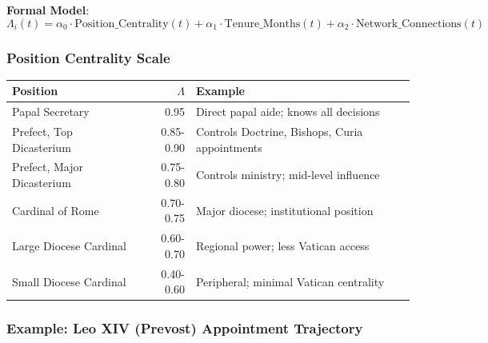 \textbf{Formal Model}:
\begin{equation}
\Lambda_i(t) = \alpha_0 \cdot \text{Position\_Centrality}(t) + \alpha_1 \cdot \text{Tenure\_Months}(t) + \alpha_2 \cdot \text{Network\_Connections}(t)
\end{equation}

\subsubsection{Position Centrality Scale}

\begin{table}[h]
\centering
\begin{tabular}{|l|r|l|}
\hline
\textbf{Position} & $\Lambda$ & \textbf{Example} \\
\hline
Papal Secretary & 0.95 & Direct papal aide; knows all decisions \\
Prefect, Top Dicasterium & 0.85-0.90 & Controls Doctrine, Bishops, Curia appointments \\
Prefect, Major Dicasterium & 0.75-0.80 & Controls ministry; mid-level influence \\
Cardinal of Rome & 0.70-0.75 & Major diocese; institutional position \\
Large Diocese Cardinal & 0.60-0.70 & Regional power; less Vatican access \\
Small Diocese Cardinal & 0.40-0.60 & Peripheral; minimal Vatican centrality \\
\hline
\end{tabular}
\end{table}

\subsubsection{Example: Leo XIV (Prevost) Appointment Trajectory}


